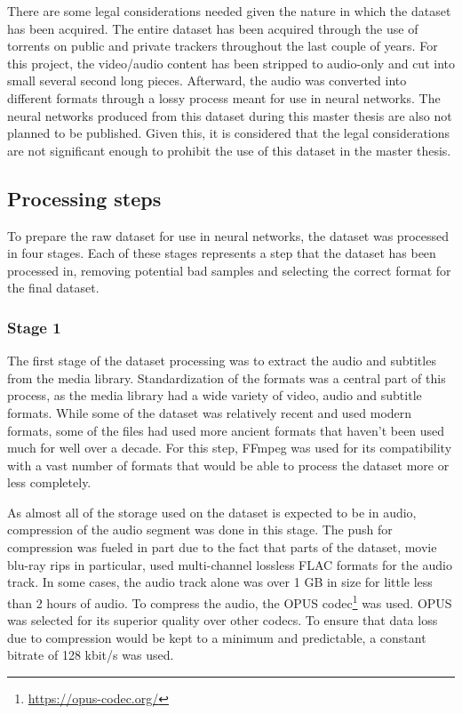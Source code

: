 There are some legal considerations needed given the nature in which the dataset has been acquired. 
The entire dataset has been acquired through the use of torrents on public and private trackers throughout the last couple of years. 
For this project, the video/audio content has been stripped to audio-only and cut into small several second long pieces. 
Afterward, the audio was converted into different formats through a lossy process meant for use in neural networks. 
The neural networks produced from this dataset during this master thesis are also not planned to be published. 
Given this, it is considered that the legal considerations are not significant enough to prohibit the use of this dataset in the master thesis.

\subsection{Processing steps}
To prepare the raw dataset for use in neural networks, the dataset was processed in four stages.
Each of these stages represents a step that the dataset has been processed in, removing potential bad samples and selecting the correct format for the final dataset.

\subsubsection{Stage 1}
The first stage of the dataset processing was to extract the audio and subtitles from the media library.
Standardization of the formats was a central part of this process, as the media library had a wide variety of video, audio and subtitle formats.
While some of the dataset was relatively recent and used modern formats, some of the files had used more ancient formats that haven't been used much for well over a decade.
For this step, FFmpeg was used for its compatibility with a vast number of formats that would be able to process the dataset more or less completely.

As almost all of the storage used on the dataset is expected to be in audio, compression of the audio segment was done in this stage.
The push for compression was fueled in part due to the fact that parts of the dataset, movie blu-ray rips in particular, used multi-channel lossless FLAC formats for the audio track.
In some cases, the audio track alone was over 1 GB in size for little less than 2 hours of audio.
To compress the audio, the OPUS codec\footnote{\url{https://opus-codec.org/}} was used.
OPUS was selected for its superior quality over other codecs\cite{opus:tests}.
To ensure that data loss due to compression would be kept to a minimum and predictable, a constant bitrate of 128 kbit/s was used.

